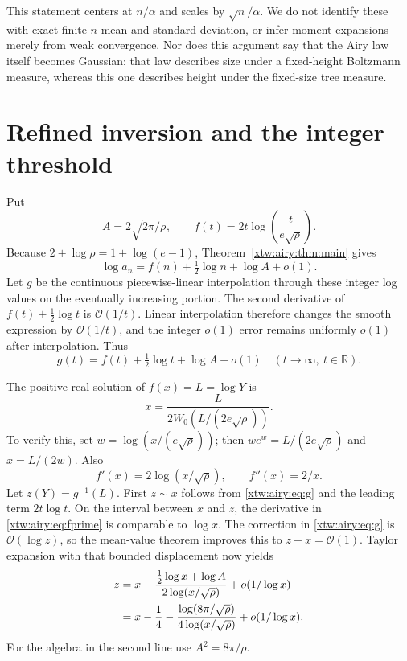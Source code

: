 \documentclass[11pt]{article}
\theoremstyle{remark}\newtheorem{remark}[theorem]{Remark}
\newcommand{\OO}{\mathcal O}
\newcommand{\R}{\mathbb R}
\begin{document}
This statement centers at $n/\alpha$ and scales by $\sqrt n/\alpha$.
We do not identify these with exact finite-$n$ mean and standard deviation,
or infer moment expansions merely from weak convergence. Nor does this
argument say that the Airy law itself becomes Gaussian: that law describes
size under a fixed-height Boltzmann measure, whereas this one describes
height under the fixed-size tree measure.

\section{Refined inversion and the integer threshold}\label{xtw:airy:sec:inverse}
Put
\begin{equation}\label{xtw:airy:eq:inversef}
 A=2\sqrt{2\pi/\rho},\qquad
 f(t)=2t\log\!\left(\frac{t}{e\sqrt\rho}\right).
\end{equation}
Because $2+\log\rho=1+\log(e-1)$, Theorem~\ref{xtw:airy:thm:main} gives
\begin{equation}\label{xtw:airy:eq:loginverse}
 \log a_n=f(n)+\tfrac12\log n+\log A+o(1).
\end{equation}
Let $g$ be the continuous piecewise-linear interpolation through these
integer log values on the eventually increasing portion. The second
derivative of $f(t)+\tfrac12\log t$ is $\OO(1/t)$. Linear interpolation
therefore changes the smooth expression by $\OO(1/t)$, and the integer
$o(1)$ error remains uniformly $o(1)$ after interpolation. Thus
\begin{equation}\label{xtw:airy:eq:g}
 g(t)=f(t)+\tfrac12\log t+\log A+o(1)
 \quad(t\to\infty,\ t\in\R).
\end{equation}

The positive real solution of $f(x)=L=\log Y$ is
\[
 x=\frac{L}{2W_0(L/(2e\sqrt\rho))}.
\]
To verify this, set $w=\log(x/(e\sqrt\rho))$; then
$we^w=L/(2e\sqrt\rho)$ and $x=L/(2w)$.
Also
\begin{equation}\label{xtw:airy:eq:fprime}
 f'(x)=2\log(x/\sqrt\rho),\qquad f''(x)=2/x.
\end{equation}
Let $z(Y)=g^{-1}(L)$. First $z\sim x$ follows from \eqref{xtw:airy:eq:g} and the
leading term $2t\log t$. On the interval between $x$ and $z$, the derivative
in \eqref{xtw:airy:eq:fprime} is comparable to $\log x$. The correction in
\eqref{xtw:airy:eq:g} is $\OO(\log z)$, so the mean-value theorem improves this to
$z-x=\OO(1)$. Taylor expansion with that bounded displacement now yields
\begin{align}
 z&=x-\frac{\tfrac12\log x+\log A}{2\log(x/\sqrt\rho)}
          +o(1/\log x)\notag\\
  &=x-\frac14-
    \frac{\log(8\pi/\sqrt\rho)}{4\log(x/\sqrt\rho)}
          +o(1/\log x).\label{xtw:airy:eq:inversefinal}
\end{align}
For the algebra in the second line use $A^2=8\pi/\rho$.
\end{document}
